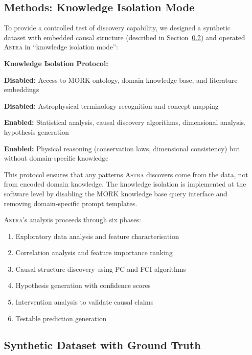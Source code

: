 \documentclass[usenatbib]{rasti}
\newcommand{\astra}{\textsc{Astra}\xspace}
\newcommand{\pc}{PC\xspace}
\newcommand{\fci}{FCI\xspace}
\begin{document}
\subsection{Methods: Knowledge Isolation Mode}
\label{sec:tc6:methods}

To provide a controlled test of discovery capability, we designed a synthetic dataset with embedded causal structure (described in Section~\ref{sec:tc6:dataset}) and operated \astra in ``knowledge isolation mode'':

\textbf{Knowledge Isolation Protocol:}
\begin{description}
  \item \textbf{Disabled:} Access to MORK ontology, domain knowledge base, and literature embeddings
  \item \textbf{Disabled:} Astrophysical terminology recognition and concept mapping
  \item \textbf{Enabled:} Statistical analysis, causal discovery algorithms, dimensional analysis, hypothesis generation
  \item \textbf{Enabled:} Physical reasoning (conservation laws, dimensional consistency) but without domain-specific knowledge
\end{description}

This protocol ensures that any patterns \astra discovers come from the data, not from encoded domain knowledge.
The knowledge isolation is implemented at the software level by disabling the MORK knowledge base query interface and removing domain-specific prompt templates.

\astra's analysis proceeds through six phases:
\begin{enumerate}
  \item[(i)] Exploratory data analysis and feature characterisation
  \item[(ii)] Correlation analysis and feature importance ranking
  \item[(iii)] Causal structure discovery using \pc and \fci algorithms
  \item[(iv)] Hypothesis generation with confidence scores
  \item[(v)] Intervention analysis to validate causal claims
  \item[(vi)] Testable prediction generation
\end{enumerate}

\subsection{Synthetic Dataset with Ground Truth}
\label{sec:tc6:dataset}
\end{document}
